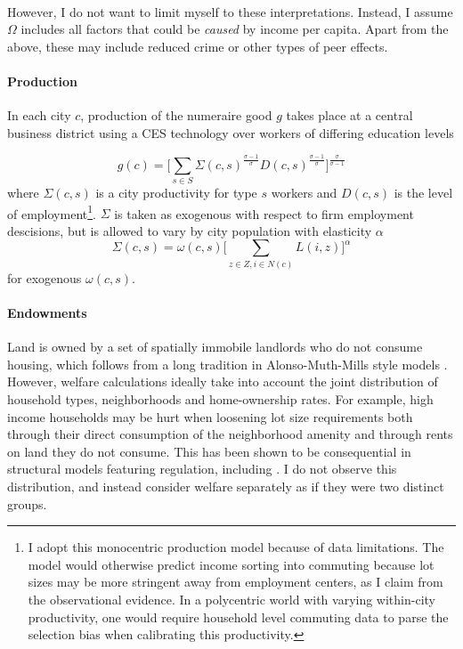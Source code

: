 \documentclass[]{article}
\begin{document}
\paragraph*{}
However, I do not want to limit myself to these interpretations. Instead, I assume $\Omega$ includes all factors that could be \textit{caused} by income per capita. Apart from the above, these may include reduced crime or other types of peer effects. 
 
\paragraph*{Production} In each city $c$, production of the numeraire good $g$ takes place at a central business district using a CES technology over workers of differing education levels

\begin{equation}\label{production}
g(c) = \bigg[\sum_{s \in S}\Sigma(c, s)^{\frac{\sigma - 1}{\sigma}}D(c, s)^{\frac{\sigma - 1}{\sigma}}\bigg]^{\frac{\sigma}{\sigma - 1}}
\end{equation}
 where $\Sigma(c, s)$ is a city productivity for type $s$ workers and $D(c, s)$ is the level of employment\footnote{I adopt this monocentric production model because of data limitations. The model would otherwise predict income sorting into commuting because lot sizes may be more stringent away from employment centers, as I claim from the observational evidence. In a polycentric world with varying within-city productivity, one would require household level commuting data to parse the selection bias when calibrating this productivity.}. $\Sigma$ is taken as exogenous with respect to firm employment descisions, but is allowed to vary by city population with elasticity $\alpha$
 \begin{equation}
 	\Sigma(c, s) = \omega(c, s)\bigg[\sum_{z \in Z, i \in N(c)}L(i, z)\bigg]^{\alpha}
 \end{equation}
 for exogenous $\omega(c, s)$. 
 
 \paragraph*{Endowments} Land is owned by a set of spatially immobile landlords who do not consume housing, which follows from a long tradition in Alonso-Muth-Mills style models \citep{bruecknerhandbook}. However, welfare calculations ideally take into account the joint distribution of household types, neighborhoods and home-ownership rates. For example, high income households may be hurt when loosening lot size requirements both through their direct consumption of the neighborhood amenity and through rents on land they do not consume. This has been shown to be consequential in structural models featuring regulation, including \cite{parkho}. I do not observe this distribution, and instead consider welfare separately as if they were two distinct groups. 
 
\end{document}
